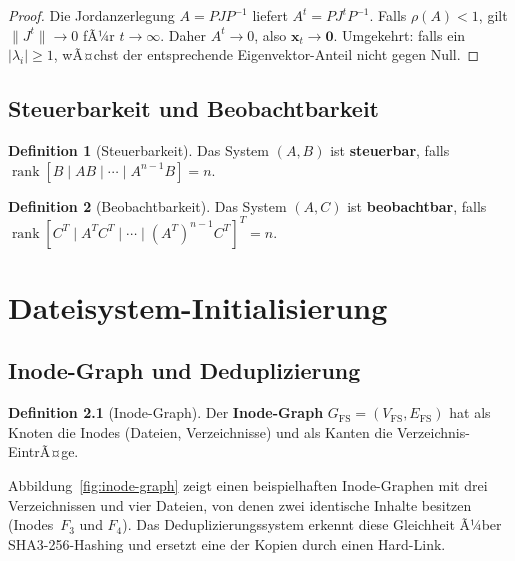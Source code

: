 ﻿\documentclass[a4paper,12pt]{scrreprt}
\theoremstyle{definition}
\newtheorem{definition}{Definition}[chapter]
\DeclareMathOperator{\rank}{rank}
\begin{document}
	\begin{proof}
		Die Jordanzerlegung $A = P J P^{-1}$ liefert $A^t = P J^t P^{-1}$.
		Falls $\rho(A) < 1$, gilt $\|J^t\| \to 0$ fÃ¼r $t \to \infty$.
		Daher $A^t \to 0$, also $\mathbf{x}_t \to \mathbf{0}$.
		Umgekehrt: falls ein $|\lambda_i| \geq 1$, wÃ¤chst der entsprechende
		Eigenvektor-Anteil nicht gegen Null.
	\end{proof}
	
	\section{Steuerbarkeit und Beobachtbarkeit}
	
	\begin{definition}[Steuerbarkeit]
		Das System $(A, B)$ ist \textbf{steuerbar}, falls
		$\rank[B \mid AB \mid \cdots \mid A^{n-1}B] = n$.
	\end{definition}
	
	\begin{definition}[Beobachtbarkeit]
		Das System $(A, C)$ ist \textbf{beobachtbar}, falls
		$\rank[C^T \mid A^T C^T \mid \cdots \mid (A^T)^{n-1}C^T]^T = n$.
	\end{definition}
	
	\chapter{Dateisystem-Initialisierung}
	
	\section{Inode-Graph und Deduplizierung}

	\begin{definition}[Inode-Graph]
		Der \textbf{Inode-Graph} $G_{\mathrm{FS}} = (V_{\mathrm{FS}}, E_{\mathrm{FS}})$
		hat als Knoten die Inodes (Dateien, Verzeichnisse) und als Kanten
		die Verzeichnis-EintrÃ¤ge.
	\end{definition}

	Abbildung~\ref{fig:inode-graph} zeigt einen beispielhaften Inode-Graphen
	mit drei Verzeichnissen und vier Dateien, von denen zwei identische
	Inhalte besitzen (Inodes~$F_3$ und $F_4$). Das Deduplizierungssystem
	erkennt diese Gleichheit Ã¼ber SHA3-256-Hashing und ersetzt eine der
	Kopien durch einen Hard-Link.
\end{document}
